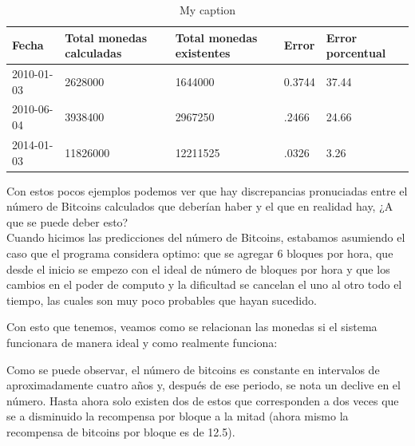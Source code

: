 \documentclass[12pt,letterpaper]{article}
\begin{document}
    \begin{table}[]
    \centering
    \caption{My caption}
    \label{my-label}
    \begin{tabular}{|l|l|l|l|l|}
    \hline
    \rowcolor[HTML]{FFFFFF}
    {\color[HTML]{333333} Fecha} & {\color[HTML]{333333} Total monedas  calculadas} & {\color[HTML]{333333} Total monedas existentes} & {\color[HTML]{333333} Error} & {\color[HTML]{333333} Error porcentual} \\ \hline
    2010-01-03                   & 2628000                                          & 1644000                                         & 0.3744                       & 37.44                                   \\ \hline
    2010-06-04                   & 3938400                                          & 2967250                                         & .2466                        & 24.66                                   \\ \hline
    2014-01-03                   & 11826000                                         & 12211525                                        & .0326                        & 3.26                                    \\ \hline
    \end{tabular}
    \end{table}

    Con estos pocos ejemplos podemos ver que hay discrepancias pronuciadas entre el n\'umero de Bitcoins calculados que deber\'ian haber y el que en realidad hay, ¿A que se puede deber esto?
    \\
    Cuando hicimos las predicciones del n\'umero de Bitcoins, estabamos asumiendo el caso que el programa considera optimo: que se agregar 6 bloques por hora, que desde el inicio se empezo con el ideal de n\'umero de bloques por hora y que los cambios en el poder de computo y la dificultad se cancelan el uno al otro todo el tiempo, las cuales son muy poco probables que hayan sucedido.

    Con esto que tenemos, veamos como se relacionan las monedas si el sistema funcionara de manera ideal y como realmente funciona:




    Como se puede observar, el n\'umero de bitcoins es constante en intervalos de aproximadamente cuatro a\~nos y, despu\'es de ese periodo, se nota un declive en el n\'umero. Hasta ahora solo existen dos de estos que corresponden a dos veces que se a disminuido la recompensa por bloque a la mitad (ahora mismo la recompensa de bitcoins por bloque es de 12.5).
\end{document}
